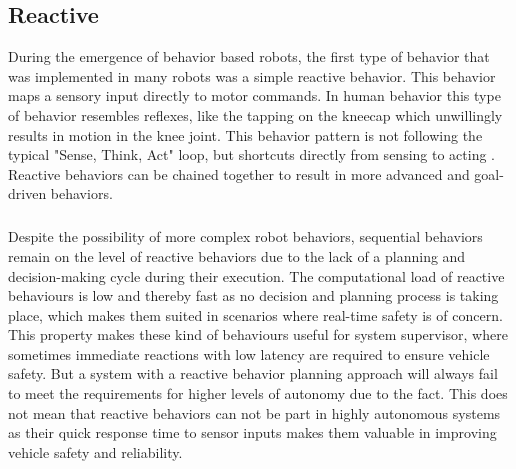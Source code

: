 \subsection{Reactive}
During the emergence of behavior based robots, the first type of behavior that was implemented in many robots was a simple reactive behavior. This behavior maps a sensory input directly to motor commands. In human behavior this type of behavior resembles reflexes, like the tapping on the kneecap which unwillingly results in motion in the knee joint. This behavior pattern is not following the typical "Sense, Think, Act" loop, but shortcuts directly from sensing to acting \cite{desilva2008}. Reactive behaviors can be chained together to result in more advanced and goal-driven behaviors. 
\subparagraph*{}
Despite the possibility of more complex robot behaviors, sequential behaviors remain on the level of reactive behaviors due to the lack of a planning and decision-making cycle during their execution. The computational load of reactive behaviours is low and thereby fast as no decision and planning process is taking place, which makes them suited in scenarios where real-time safety is of concern. This property makes these kind of behaviours useful for system supervisor, where sometimes immediate reactions with low latency are required to ensure vehicle safety. But a system with a reactive behavior planning approach will always fail to meet the requirements for higher levels of autonomy due to the fact. This does not mean that reactive behaviors can not be part in highly autonomous systems as their quick response time to sensor inputs makes them valuable in improving vehicle safety and reliability. 


